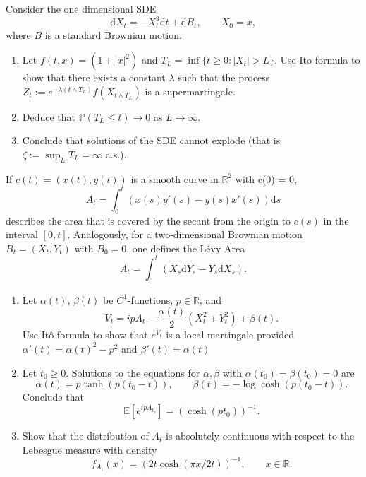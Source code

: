 \documentclass{article}
\newcommand{\assign}{:=}
\newcommand{\mathd}{\mathrm{d}}
\newenvironment{enumeratealpha}{\begin{enumerate}[a{\textup{)}}] }{\end{enumerate}}
{\theorembodyfont{\rmfamily\small}\newtheorem{exercise}{Exercise}}
\begin{document}
\begin{exercise}
  [Pts 2+2+2] Consider the one dimensional SDE
  \[ \mathd X_t = - X_t^3 \mathd t + \mathd B_t, \qquad X_0 = x, \]
  where $B$ is a standard Brownian motion.
  \begin{enumeratealpha}
    \item Let $f (t, x) = (1 + | x |^2)$ and $T_L = \inf \{ t \geqslant 0 : |
    X_t | > L \}$. Use Ito formula to show that there exists a constant
    $\lambda$ such that the process $Z_t \assign e^{- \lambda (t \wedge T_L)}
    f (X_{t \wedge T_L})$ is a supermartingale.
    
    \item Deduce that $\mathbb{P} (T_L \leqslant t) \rightarrow 0$ as $L
    \rightarrow \infty$.
    
    \item Conclude that solutions of the SDE cannot explode (that is $\zeta
    \assign \sup_L T_L = \infty$ a.s.).
  \end{enumeratealpha}
\end{exercise}

\hrulefill

\begin{exercise}
  [Pts 2+2+2] If $c (t) = (x (t), y (t))$ is a smooth curve in $\mathbb{R}^2$
  with c(0) = 0,
  \[ A_t = \int_0^t (x (s) y' (s) - y (s) x' (s)) \mathd s \]
  describes the area that is covered by the secant from the origin to $c (s)$
  in the interval $[0, t]$. Analogously, for a two-dimensional Brownian motion
  $B_t = (X_t, Y_t)$ with $B_0 = 0$, one defines the L{\'e}vy Area
  \[ A_t = \int_0^t (X_s \mathd Y_s - Y_s \mathd X_s) . \]
  \begin{enumeratealpha}
    \item Let $\alpha (t)$, $\beta (t)$ be $C^1$-functions, $p \in
    \mathbb{R}$, and
    \[ V_t = ipA_t - \frac{\alpha (t)}{2} (X^2_t + Y^2_t) + \beta (t) . \]
    Use It{\^o} formula to show that $e^{V_t}$ is a local martingale provided
    $\alpha' (t) = \alpha (t)^2 - p^2$ and $\beta' (t) = \alpha (t)$
    
    \item Let $t_0 \geqslant 0$. Solutions to the equations for $\alpha,
    \beta$ with $\alpha (t_0) = \beta (t_0) = 0$ are
    \[ \alpha (t) = p \tanh (p (t_0 - t)), \qquad \beta (t) = - \log \cosh (p
       (t_0 - t)) . \]
    Conclude that
    \[ \mathbb{E} \left[ e^{ipA_{t_0}} \right] = (\cosh (p t_0))^{- 1} . \]
    \item Show that the distribution of $A_t$ is absolutely continuous with
    respect to the Lebesgue measure with density
    \[ f_{A_t} (x) = (2 t \cosh (\pi x / 2 t))^{- 1}, \qquad x \in \mathbb{R}.
    \]
  \end{enumeratealpha}
\end{exercise}

\hrulefill

\
\end{document}
